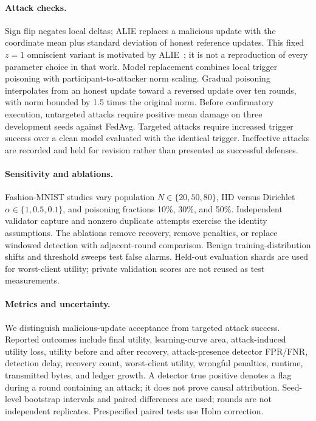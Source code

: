 \paragraph{Attack checks.}
Sign flip negates local deltas; ALIE replaces a malicious update with the
coordinate mean plus standard deviation of honest reference updates. This fixed
$z=1$ omniscient variant is motivated by ALIE~\cite{baruch2019}; it is not a
reproduction of every parameter choice in that work. Model
replacement combines local trigger poisoning with participant-to-attacker norm
scaling. Gradual poisoning interpolates from an honest update toward a reversed
update over ten rounds, with norm bounded by 1.5 times the original norm.
Before confirmatory execution, untargeted attacks require positive mean damage
on three development seeds against FedAvg. Targeted attacks require increased
trigger success over a clean model evaluated with the identical trigger.
Ineffective attacks are recorded and held for revision rather than presented as
successful defenses.

\paragraph{Sensitivity and ablations.}
Fashion-MNIST studies vary population $N\in\{20,50,80\}$, IID versus Dirichlet
$\alpha\in\{1,0.5,0.1\}$, and poisoning fractions 10\%, 30\%, and 50\%.
Independent validator capture and nonzero duplicate attempts exercise the
identity assumptions. The ablations remove recovery, remove penalties, or replace
windowed detection with adjacent-round comparison. Benign training-distribution
shifts and threshold sweeps test false alarms. Held-out evaluation shards are
used for worst-client utility; private validation scores are not reused as test
measurements.

\paragraph{Metrics and uncertainty.}
We distinguish malicious-update acceptance from targeted attack success.
Reported outcomes include final utility, learning-curve area, attack-induced
utility loss, utility before and after recovery, attack-presence detector FPR/FNR,
detection delay, recovery count, worst-client utility, wrongful penalties,
runtime, transmitted bytes, and ledger growth. A detector true positive denotes
a flag during a round containing an attack; it does not prove causal attribution.
Seed-level bootstrap intervals and paired differences are used; rounds are not
independent replicates. Prespecified paired tests use Holm correction.

